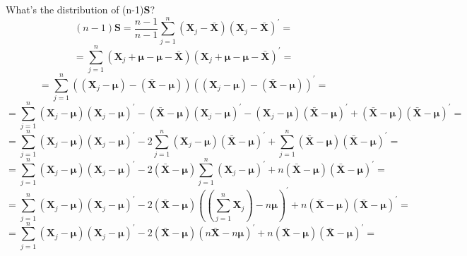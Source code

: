 \documentclass{article}
\begin{document}
What's the distribution of (n-1)\textbf{S}?
    \[
        (n-1)\textbf{S}
        =
        \frac{n-1}{n -1}
        \sum_{j=1}^{n}{
            \left(\textbf{X}_{j} - \bar{\textbf{X}}\right)
            {\left(\textbf{X}_{j} - \bar{\textbf{X}}\right)}^{\prime}
        }
        =
    \]
    \[
        =
        \sum_{j=1}^{n}{
            \left(\textbf{X}_{j} + \bm{\mu} - \bm{\mu} - \bar{\textbf{X}}\right)
            {\left(\textbf{X}_{j} + \bm{\mu} - \bm{\mu} - \bar{\textbf{X}}\right)}^{\prime}
        }
        =
    \]
    \[
        =
        \sum_{j=1}^{n}{
            \left((\textbf{X}_{j} - \bm{\mu}) - (\bar{\textbf{X}} - \bm{\mu})\right)
            {\left((\textbf{X}_{j} - \bm{\mu}) - (\bar{\textbf{X}} - \bm{\mu})\right)}^{\prime}
        }
        =
    \]
    \[
        =
        \scriptstyle{
        \sum_{j=1}^{n}{
            (\textbf{X}_{j} - \bm{\mu}){(\textbf{X}_{j} - \bm{\mu})}^{\prime}
            -
            (\bar{\textbf{X}} - \bm{\mu}){(\textbf{X}_{j} - \bm{\mu})}^{\prime}
            -
            (\textbf{X}_{j} - \bm{\mu}){(\bar{\textbf{X}} - \bm{\mu})}^{\prime}
            +
            (\bar{\textbf{X}} - \bm{\mu}){(\bar{\textbf{X}} - \bm{\mu})}^{\prime}
        }
        }
        =
    \]
    \[
        =
        \scriptstyle{
        \sum_{j=1}^{n}{
            (\textbf{X}_{j} - \bm{\mu}){(\textbf{X}_{j} - \bm{\mu})}^{\prime}
        }
        -
        2
        \sum_{j=1}^{n}{
            (\textbf{X}_{j} - \bm{\mu}){(\bar{\textbf{X}} - \bm{\mu})}^{\prime}
        }
        +
        \sum_{j=1}^{n}{
            (\bar{\textbf{X}} - \bm{\mu}){(\bar{\textbf{X}} - \bm{\mu})}^{\prime}
        }
        }
        =
    \]
    \[
        =
        \scriptstyle{
        \sum_{j=1}^{n}{
            (\textbf{X}_{j} - \bm{\mu}){(\textbf{X}_{j} - \bm{\mu})}^{\prime}
        }
        -
        2
        (\bar{\textbf{X}} - \bm{\mu})
        \sum_{j=1}^{n}{
            {(\textbf{X}_{j} - \bm{\mu})}^{\prime}
        }
        +
        n
        (\bar{\textbf{X}} - \bm{\mu}){(\bar{\textbf{X}} - \bm{\mu})}^{\prime}
        }
        =
    \]
    \[
        =
        \scriptstyle{
        \sum_{j=1}^{n}{
            (\textbf{X}_{j} - \bm{\mu}){(\textbf{X}_{j} - \bm{\mu})}^{\prime}
        }
        -
        2
        (\bar{\textbf{X}} - \bm{\mu})
        {((\sum_{j=1}^{n}{\textbf{X}_{j}}) - n\bm{\mu})}^{\prime}
        +
        n
        (\bar{\textbf{X}} - \bm{\mu}){(\bar{\textbf{X}} - \bm{\mu})}^{\prime}
        }
        =
    \]
    \[
        =
        \scriptstyle{
        \sum_{j=1}^{n}{
            (\textbf{X}_{j} - \bm{\mu}){(\textbf{X}_{j} - \bm{\mu})}^{\prime}
        }
        -
        2
        (\bar{\textbf{X}} - \bm{\mu})
        {(n\bar{\textbf{X}} - n\bm{\mu})}^{\prime}
        +
        n
        (\bar{\textbf{X}} - \bm{\mu}){(\bar{\textbf{X}} - \bm{\mu})}^{\prime}
        }
        =
    \]
\end{document}
